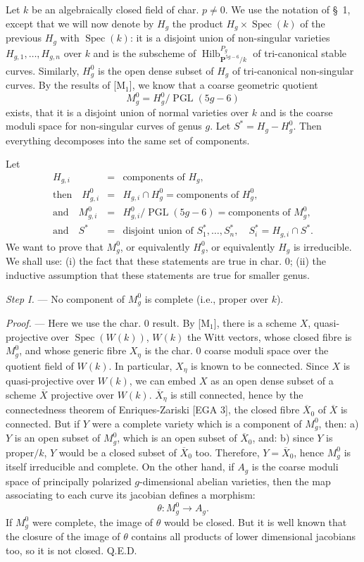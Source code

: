 \documentclass[10pt]{article}
\newcommand{\Spec}{\operatorname{Spec}}
\newcommand{\PGL}{\operatorname{PGL}}
\newcommand{\Hilb}{\operatorname{Hilb}}
\newcommand{\PP}{\mathbf P}
\begin{document}
Let $k$ be an algebraically closed field of char. $p\ne0$. We use the notation of \S~1, except that we will now denote by $H_g$ the product $H_g\times\Spec(k)$ of the previous $H_g$ with $\Spec(k)$: it is a disjoint union of non-singular varieties $H_{g,1},\ldots,H_{g,n}$ over $k$ and is the subscheme of $\Hilb_{\PP^{5g-6}/k}^{P_g}$ of tri-canonical stable curves. Similarly, $H_g^0$ is the open dense subset of $H_g$ of tri-canonical non-singular curves. By the results of [M$_1$], we know that a coarse geometric quotient
\[
M_g^0=H_g^0/\PGL(5g-6)
\]
exists, that it is a disjoint union of normal varieties over $k$ and is the coarse moduli space for non-singular curves of genus $g$. Let $S^*=H_g-H_g^0$. Then everything decomposes into the same set of components.

Let
\[
\begin{array}{rcl}
H_{g,i}&=&\text{components of }H_g,\\
\text{then}\quad H^0_{g,i}&=&H_{g,i}\cap H_g^0=\text{components of }H_g^0,\\
\text{and}\quad M^0_{g,i}&=&H^0_{g,i}/\PGL(5g-6)=\text{components of }M_g^0,\\
\text{and}\quad S^*&=&\text{disjoint union of }S_1^*,\ldots,S_n^*,\quad S_i^*=H_{g,i}\cap S^*.
\end{array}
\]
We want to prove that $M_g^0$, or equivalently $H_g^0$, or equivalently $H_g$ is irreducible. We shall use: (i) the fact that these statements are true in char. 0; (ii) the inductive assumption that these statements are true for smaller genus.

\medskip
\noindent\emph{Step I.} --- No component of $M_g^0$ is complete (i.e., proper over $k$).

\noindent\emph{Proof.} --- Here we use the char. 0 result. By [M$_1$], there is a scheme $X$, quasi-projective over $\Spec(W(k))$, $W(k)$ the Witt vectors, whose closed fibre is $M_g^0$, and whose generic fibre $X_\eta$ is the char. 0 coarse moduli space over the quotient field of $W(k)$. In particular, $X_\eta$ is known to be connected. Since $X$ is quasi-projective over $W(k)$, we can embed $X$ as an open dense subset of a scheme $\overline X$ projective over $W(k)$. $\overline X_\eta$ is still connected, hence by the connectedness theorem of Enriques-Zariski [EGA 3], the closed fibre $\overline X_0$ of $\overline X$ is connected. But if $Y$ were a complete variety which is a component of $M_g^0$, then: a) $Y$ is an open subset of $M_g^0$, which is an open subset of $\overline X_0$, and: b) since $Y$ is proper$/k$, $Y$ would be a closed subset of $\overline X_0$ too. Therefore, $Y=\overline X_0$, hence $M_g^0$ is itself irreducible and complete. On the other hand, if $A_g$ is the coarse moduli space of principally polarized $g$-dimensional abelian varieties, then the map associating to each curve its jacobian defines a morphism:
\[
\theta:M_g^0\to A_g.
\]
If $M_g^0$ were complete, the image of $\theta$ would be closed. But it is well known that the closure of the image of $\theta$ contains all products of lower dimensional jacobians too, so it is not closed. Q.E.D.
\end{document}
